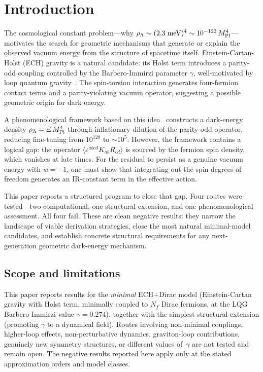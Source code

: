\documentclass[11pt,letterpaper]{article}
\newcommand{\MPl}{M_{\rm Pl}}
\newcommand{\BI}{\gamma}               %
\begin{document}
\section{Introduction}\label{sec:intro}

The cosmological constant problem---why $\rho_\Lambda \sim (2.3\;\text{meV})^4
\sim 10^{-122}\,\MPl^4$---motivates the search for geometric mechanisms that
generate or explain the observed vacuum energy from the structure of
spacetime itself. Einstein-Cartan-Holst (ECH) gravity is a natural candidate:
its Holst term introduces a parity-odd coupling controlled by the
Barbero-Immirzi parameter $\BI$, well-motivated by loop quantum
gravity~\cite{Freidel2005,Mercuri2009}. The spin-torsion interaction
generates four-fermion contact terms and a parity-violating vacuum
operator, suggesting a possible geometric origin for dark energy.

A phenomenological framework based on this idea~\cite{Golden2026} constructs
a dark-energy density $\rho_\Lambda = \Xi\,\MPl^4$ through inflationary
dilution of the parity-odd operator, reducing fine-tuning from $10^{120}$ to
${\sim}10^5$. However, the framework contains a logical gap: the operator
$\langle\varepsilon^{abcd}K_{ab}R_{cd}\rangle$ is sourced by the fermion
spin density, which vanishes at late times. For the residual to persist as a
genuine vacuum energy with $w=-1$, one must show that integrating out the spin
degrees of freedom generates an IR-constant term in the effective action.

This paper reports a structured program to close that gap. Four routes were
tested---two computational, one structural extension, and one
phenomenological assessment. All four fail. These are clean negative results:
they narrow the landscape of viable derivation strategies, close the most
natural minimal-model candidates, and establish concrete structural
requirements for any next-generation geometric dark-energy mechanism.

\subsection*{Scope and limitations}
This paper reports results for the \emph{minimal} ECH$+$Dirac model
(Einstein-Cartan gravity with Holst term, minimally coupled to $N_f$ Dirac
fermions, at the LQG Barbero-Immirzi value $\BI=0.274$), together with the
simplest structural extension (promoting $\BI$ to a dynamical field). Routes
involving non-minimal couplings, higher-loop effects, non-perturbative
dynamics, graviton-loop contributions, genuinely new symmetry structures,
or different values of~$\BI$ are not tested and remain open. The negative
results reported here apply only at the stated approximation orders and
model classes.
\end{document}
